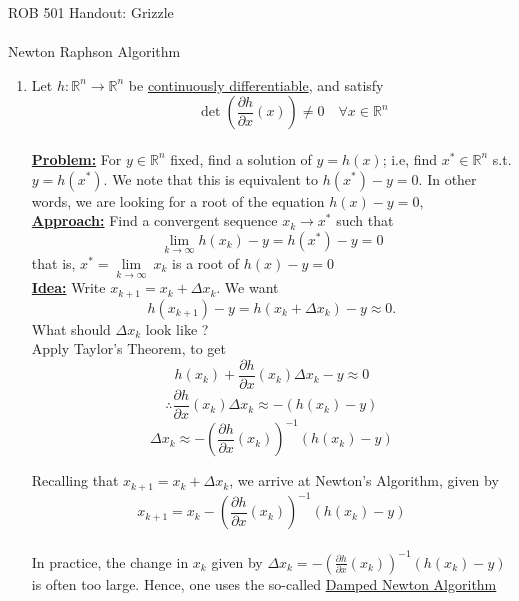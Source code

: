 \documentclass[letterpaper]{article}
\date{}
\newcommand{\Rn}{\mathbb{R}^n}
\newcommand{\R}{\mathbb{R}}
\newcommand{\pardiff}[2][]{\frac{\partial#1}{\partial#2}}
\newcommand{\limin}[2][\infty]{\lim\limits_{#1\rightarrow#2}}
\begin{document}
\baselineskip=48pt
\setlength{\parskip}{.3in}
\setlength{\itemsep}{.3in}

\pagestyle{plain}


{\Large \bf
\begin{center}
ROB 501 Handout: Grizzle \\
\mbox{} \\
Newton Raphson Algorithm
\end{center}
}

\Large

\begin{enumerate}
\setlength{\itemsep}{.2cm}
\item[]
Let $h:\Rn\rightarrow \Rn$ be \underline{continuously differentiable}, and satisfy
$$\quad\quad\quad\boxed{\det\left(\pardiff[h]{x}(x)\right)\neq 0 \quad \forall x\in \R^n}$$ \\

\textbf{\underline{Problem:}} For $y\in \Rn$ fixed, find a solution of $y = h(x)$; i.e, find $x^*\in \Rn$ s.t. $y=h(x^*)$. We note that this is equivalent to $h(x^*)-y=0$. In other words, we are looking for a root of the equation $h(x)-y=0$,\\

\textbf{\underline{Approach:}} Find a convergent sequence $x_k\to x^*$ such that $$\boxed{\limin[k]{\infty}h(x_k)-y=h(x^*)-y=0}$$
that is, $x^*=\limin[k]{\infty}~x_k$ is a root of $h(x)-y=0$ \\

\textbf{\underline{Idea:}} Write $x_{k+1}=x_k+\Delta x_k$. We want
$$h(x_{k+1})-y = h(x_k+\Delta x_k)-y\approx 0.$$
What should $\Delta x_k$ look like ?\\

Apply Taylor's Theorem, to get
$$h(x_k)+\pardiff[h]{x}(x_k)\Delta x_k-y\approx 0$$
$$\therefore \pardiff[h]{x}(x_k)\Delta x_k \approx -(h(x_k)-y)$$
$$\Delta x_k \approx -\left(\pardiff[h]{x}(x_k)\right)^{-1}(h(x_k)-y)$$

Recalling that $x_{k+1}=x_k+\Delta x_k$, we arrive at Newton's Algorithm, given by
$$\boxed{x_{k+1} = x_k-\left(\pardiff[h]{x}(x_k)\right)^{-1}(h(x_k)-y)}$$\\

In practice, the change in $x_k$ given by  $\Delta x_k = -\left(\pardiff[h]{x}(x_k)\right)^{-1}(h(x_k)-y)$ is often too large. Hence, one uses the so-called \underline{Damped Newton Algorithm}


\end{enumerate}
\end{document}
